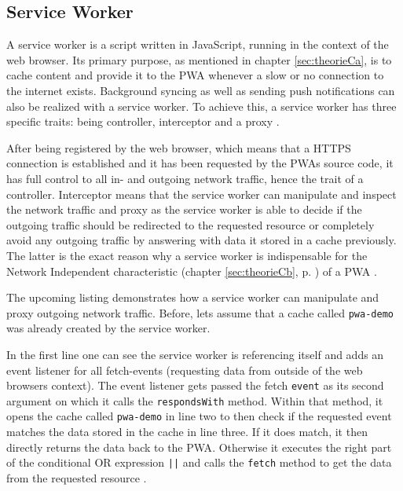 \subsection{Service Worker}
\label{sec:theorieCc}

A service worker is a script written in JavaScript, running in the context of the web browser. Its primary purpose, as mentioned in chapter \ref{sec:theorieCa}, is to cache content and provide it to the  \acs{PWA} whenever a slow or no connection to the internet exists. Background syncing as well as sending push notifications can also be realized with a service worker. To achieve this, a service worker has three specific traits: being controller, interceptor and a proxy \cite[p. 176]{liebelProgressiveWebApps2019}.

After being registered by the web browser, which means that a HTTPS connection is established and it has been requested by the  \acs{PWA}s source code, it has full control to all in- and outgoing network traffic, hence the trait of a controller. Interceptor means that the service worker can manipulate and inspect the network traffic and proxy as the service worker is able to decide if the outgoing traffic should be redirected to the requested resource or completely avoid any outgoing traffic by answering with data it stored in a cache previously. The latter is the exact reason why a service worker is indispensable for the Network Independent characteristic (chapter \ref{sec:theorieCb}, p. \pageref{sec:theorieCb}) of a  \acs{PWA} \cite[p. 176-177]{liebelProgressiveWebApps2019}.

The upcoming listing demonstrates how a service worker can manipulate and proxy outgoing network traffic. Before, lets assume that a cache called \texttt{pwa-demo} was already created by the service worker.

\begin{center}
	\begin{minipage}{\textwidth}
		
	\end{minipage}
\end{center}

In the first line one can see the service worker is referencing itself and adds an event listener for all fetch-events (requesting data from outside of the web browsers context). The event listener gets passed the fetch \texttt{event} as its second argument on which it calls the \texttt{respondsWith} method. Within that method, it opens the cache called \texttt{pwa-demo} in line two to then check if the requested event matches the data stored in the cache in line three. If it does match, it then directly returns the data back to the  \acs{PWA}. Otherwise it executes the right part of the conditional OR expression \texttt{||} and calls the \texttt{fetch} method to get the data from the requested resource \cite[p. 60]{liebelProgressiveWebApps2019}.


